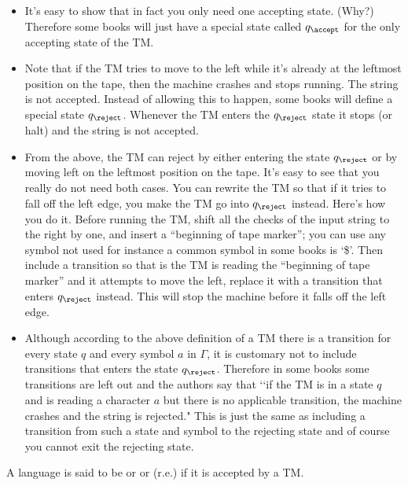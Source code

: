 \begin{defn}
\begin{itemize}
 \item It's easy to show that in fact you only need one accepting
 state. (Why?) Therefore some books will just have a special state
 called $q_{\accept}$ for the only accepting state of the TM.
 \item Note that if the TM tries to move to the left while it's already at the leftmost
 position on the tape, then the machine crashes and stops running. The string is not accepted.
 Instead of allowing this to happen, some books will define a
 special state $q_{\reject}$. Whenever the TM enters the $q_\reject$ state it
 stops (or halt) and the string is not accepted.
 \item From the above, the TM can reject by either entering the
 state $q_{\reject}$ or by moving left on the leftmost position on
 the tape. It's easy to see that you really do not need both
 cases. You can rewrite the TM so that if it tries to fall off the
 left edge, you make the TM go into $q_{\reject}$ instead. Here's
 how you do it. Before running the TM, shift all the checks of the
 input string to the right by one, and insert a ``beginning of tape
 marker''; you can use any symbol not used for instance a common symbol in some books is `\$'.
 Then include a transition so that is the TM is reading
 the ``beginning of tape marker'' and it attempts to move the
 left, replace it with a transition that enters $q_{\reject}$
 instead. This will stop the machine before it falls off the left
 edge.
 \item Although according to the above definition of a TM there is
 a transition for every state $q$ and every symbol $a$ in
 $\Gamma$, it is customary not to include transitions that enters
 the state $q_{\reject}$. Therefore in some books some transitions
 are left out and the authors say that \lq\lq if the TM is in a state $q$
 and is reading a character $a$ but there is no applicable
 transition, the machine crashes and the string is rejected." This
 is just the same as including a transition from such a state and
 symbol to the rejecting state and of course you cannot exit the
 rejecting state.
 \end{itemize}
\end{defn}

\begin{defn}
A language is said to be
or
or
 (r.e.)
if it is accepted by a TM.
\end{defn}

